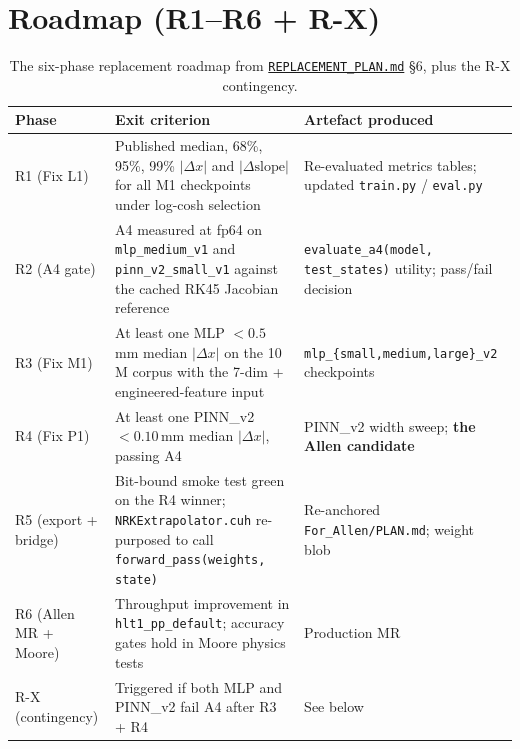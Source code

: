 \documentclass[11pt,a4paper]{article}
\begin{document}
\section{Roadmap (R1--R6 + R-X)}\label{sec:roadmap}

\begin{table}[h!]
\centering
\caption{The six-phase replacement roadmap from
\href{run:../../experiments/gen_3/REPLACEMENT_PLAN.md}{\texttt{REPLACEMENT\_PLAN.md}}
§6, plus the R-X contingency.}
\label{tab:roadmap}
\small
\begin{tabularx}{\linewidth}{l X l}
\toprule
Phase & Exit criterion & Artefact produced \\
\midrule
R1 (Fix L1) & Published median, 68\%, 95\%, 99\% $|\Delta x|$ and $|\Delta\mathrm{slope}|$ for all M1 checkpoints under log-cosh selection
           & Re-evaluated metrics tables; updated \texttt{train.py} / \texttt{eval.py} \\
R2 (A4 gate) & A4 measured at fp64 on \texttt{mlp\_medium\_v1} and \texttt{pinn\_v2\_small\_v1} against the cached RK45 Jacobian reference
           & \texttt{evaluate\_a4(model, test\_states)} utility; pass/fail decision \\
R3 (Fix M1) & At least one MLP $<0.5$\,mm median $|\Delta x|$ on the 10\,M corpus with the 7-dim + engineered-feature input
           & \texttt{mlp\_\{small,medium,large\}\_v2} checkpoints \\
R4 (Fix P1) & At least one PINN\_v2 $<0.10$\,mm median $|\Delta x|$, passing A4
           & PINN\_v2 width sweep; \textbf{the Allen candidate} \\
R5 (export + bridge) & Bit-bound smoke test green on the R4 winner; \texttt{NRKExtrapolator.cuh} re-purposed to call \texttt{forward\_pass(weights, state)}
           & Re-anchored \texttt{For\_Allen/PLAN.md}; weight blob \\
R6 (Allen MR + Moore) & Throughput improvement in \texttt{hlt1\_pp\_default}; accuracy gates hold in Moore physics tests
           & Production MR \\
\midrule
R-X (contingency) & Triggered if both MLP and PINN\_v2 fail A4 after R3 + R4
           & See below \\
\bottomrule
\end{tabularx}
\end{table}
\end{document}
